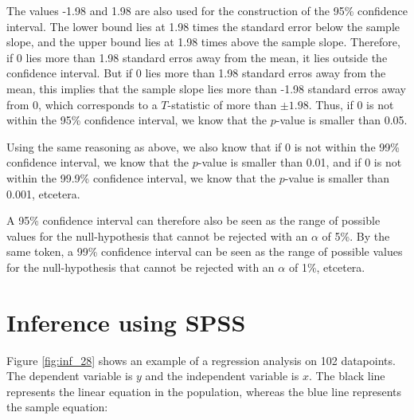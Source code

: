 \documentclass[]{report}\usepackage[]{graphicx}\usepackage[]{color}
\begin{document}
The values -1.98 and 1.98 are also used for the construction of the 95\% confidence interval. The lower bound lies at 1.98 times the standard error below the sample slope, and the upper bound lies at 1.98 times above the sample slope. Therefore, if 0 lies more than 1.98 standard erros away from the mean, it lies outside the confidence interval. But if 0 lies more than 1.98 standard erros away from the mean, this implies that the sample slope lies more than -1.98 standard erros away from 0, which corresponds to a $T$-statistic of more than $\pm 1.98$. Thus, if 0 is not within the 95\% confidence interval, we know that the $p$-value is smaller than 0.05.

Using the same reasoning as above, we also know that if 0 is not within the 99\% confidence interval, we know that the $p$-value is smaller than 0.01, and if 0 is not within the 99.9\% confidence interval, we know that the $p$-value is smaller than 0.001, etcetera.

A 95\% confidence interval can therefore also be seen as the range of possible values for the null-hypothesis that cannot be rejected with an $\alpha$ of 5\%. By the same token, a 99\% confidence interval can be seen as the range of possible values for the null-hypothesis that cannot be rejected with an $\alpha$ of 1\%, etcetera.



\section{Inference using SPSS}

Figure \ref{fig:inf_28} shows an example of a regression analysis on 102 datapoints. The dependent variable is $y$ and the independent variable is $x$. The black line represents the linear equation in the population, whereas the blue line represents the sample equation:
\end{document}
